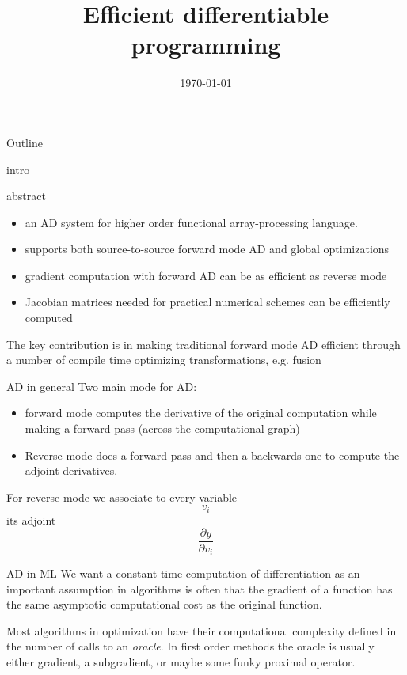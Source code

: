\documentclass[smaller]{beamer}
\date{\today}
\title{Efficient differentiable programming}
\begin{document}
\maketitle
\begin{frame}{Outline}
\tableofcontents
\end{frame}

\begin{frame}{intro}
\begin{block}{abstract}
\begin{itemize}
\item an AD system for higher order functional array-processing language.
\item supports both source-to-source forward mode AD and global optimizations
\item gradient computation with forward AD can be as efficient as reverse mode
\item Jacobian matrices needed for practical numerical schemes can be efficiently computed
\end{itemize}
The key contribution is in making traditional forward mode AD efficient
through a number of compile time optimizing transformations, e.g. fusion
\end{block}
\end{frame}

\begin{frame}{AD in general}
Two main mode for AD:
\begin{itemize}
\item forward mode computes the derivative of the original computation while making a forward pass (across the computational graph)
\item Reverse mode does a forward pass and then a backwards one to compute the adjoint derivatives.
\end{itemize}
For reverse mode  we associate to every variable $$ v_i $$ its adjoint $$ \frac{\partial y}{\partial v_i} $$
\end{frame}

\begin{frame}[label={sec:org075497c}]{AD in ML}
We want a constant time computation of differentiation as an important
assumption in algorithms is often that the gradient of a function has the
same asymptotic computational cost as the original function.

Most algorithms in optimization have their computational complexity defined in
the number of calls to an \emph{oracle}. In \alert{first order methods} the oracle
is usually either gradient, a subgradient, or maybe some funky proximal
operator.
\end{frame}
\end{document}
